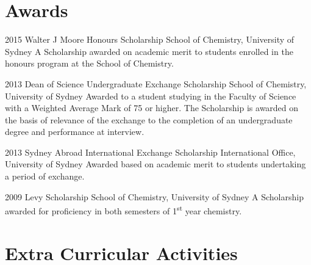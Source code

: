\documentclass{friggeri-cv} %
\begin{document}
\pagebreak

\section{Awards}

\begin{entrylist}


\entry
{2015}
{Walter J Moore Honours Scholarship}
{School of Chemistry, University of Sydney}
{A Scholarship awarded on academic merit to students enrolled in the honours program at the School of Chemistry.}

\entry
{2013}
{Dean of Science Undergraduate Exchange Scholarship}
{School of Chemistry, University of Sydney}
{Awarded to a student studying in the Faculty of Science with a Weighted Average Mark of 75 or higher. The Scholarship is awarded on the basis of relevance of the exchange to the completion of an undergraduate degree and performance at interview.}

\entry
{2013}
{Sydney Abroad International Exchange Scholarship}
{International Office, University of Sydney}
{Awarded based on academic merit to students undertaking a period of exchange.}

\entry
{2009}
{Levy Scholarship}
{School of Chemistry, University of Sydney}
{A Scholarship awarded for proficiency in both semesters of 1\textsuperscript{st} year chemistry.}


\end{entrylist}


\section{Extra Curricular Activities}
\end{document}
